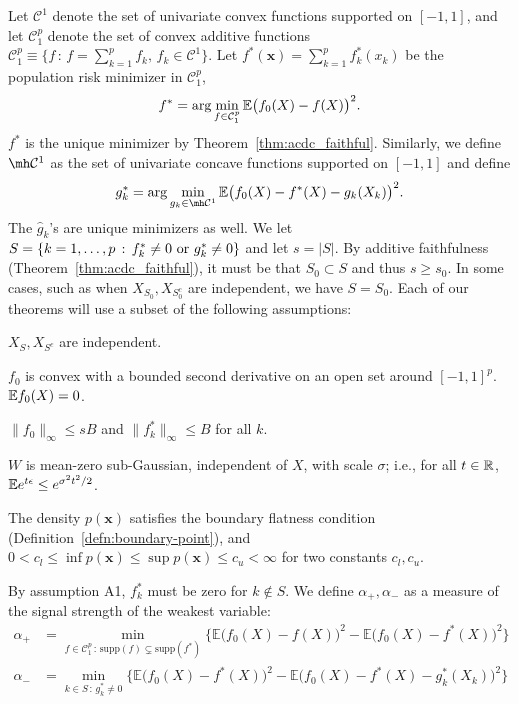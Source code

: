 Let $\mathcal{C}^1$ denote the set of univariate convex functions
supported on $[-1,1]$, 
and let  $\mathcal{C}_1^{p}$ denote the set of convex additive functions
$\mathcal{C}_1^p \equiv \{ f \,:\, f = \sum_{k=1}^p f_k, \,
   f_k \in \mathcal{C}^1 \} $.  
Let $f^*(\mathbf{x}) = \sum_{k=1}^p f^*_k(x_k)$ be the population risk
minimizer in $\mathcal{C}_1^p$, 
\begin{equation}
f^* = \arg\min_{f \in \mathcal{C}_1^p} {\mathbb E}\big(f_0(X) - f(X)
\big)^2.
\end{equation}
$f^*$ is the unique minimizer by Theorem~\ref{thm:acdc_faithful}. Similarly, we define $\mh \mathcal{C}^1$ as the set of univariate concave functions supported on $[-1, 1]$ and define
\begin{equation}
g^*_k = \arg\min_{g_k \in \mh \mathcal{C}^1} \E \big( f_0(X) - f^*(X)
- g_k(X_k) \big)^2.
\end{equation}
The $\hat{g}_k$'s are unique minimizers as well. We let $S = \{ k = 1,\ldots,p \,:\, f^*_k \neq 0 \textrm{ or } g^*_k \neq 0\}$ and let $s = |S|$. By additive faithfulness (Theorem~\ref{thm:acdc_faithful}), it must be that $S_0 \subset S$ and thus $s \geq s_0$. In some cases, such as when $X_{S_0}, X_{S^c_0}$ are independent, we have $S = S_0$.
Each of our theorems will use a subset of the following assumptions:
\begin{packed_enum}
\item[A1:] $X_S, X_{S^c}$ are independent. 
\item[A2:] $f_0$ is convex with a bounded second derivative on an open set around $[-1,1]^p$. ${\mathbb E} f_0(X) = 0$.
\item[A3:] $\|f_0\|_\infty \leq sB$ and $\| f^*_k \|_\infty \leq B$ for all $k$.
\item[A4:] $W$ is mean-zero sub-Gaussian, independent of $X$, with scale $\sigma$; i.e., for all $t \in {\mathbb R}$, ${\mathbb E} e^{t \epsilon} \leq e^{\sigma^2 t^2 / 2}$.
\item[A5:] The density $p(\mathbf{x})$ satisfies the boundary flatness condition (Definition~\ref{defn:boundary-point}), and $0 < c_l \leq \inf p(\mathbf{x}) \leq \sup p(\mathbf{x}) \leq c_u < \infty$ for two constants $c_l, c_u$. 
\end{packed_enum}
By assumption A1, $f^*_k$ must be zero for $k\notin S$.
We define $\alpha_{+}, \alpha_{-}$ as a measure of the signal strength of the weakest variable:
\begin{align}
\alpha_{+} &= \min_{f \in \mathcal{C}_1^p \,:\, \textrm{supp}(f) \subsetneq \textrm{supp}(f^*)} 
       \Big\{ \mathbb{E} \big( f_0(X) - f(X) \big)^2 - 
        \mathbb{E} \big( f_0(X) - f^*(X) \big)^2  \Big\} \label{eqn:signal_level_defn} \\
\alpha_{-} &=   \min_{k \in S \,:\, g^*_k \neq 0}
      \Big\{ \mathbb{E} \big( f_0(X) - f^*(X) \big)^2 - 
    \mathbb{E} \big( f_0(X) - f^*(X) - g^*_k(X_k) \big)^2 \Big\} \nonumber
\end{align}
